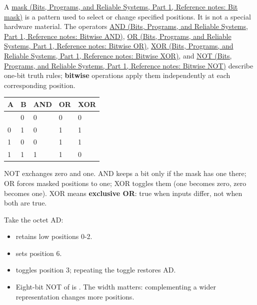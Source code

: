 \hypertarget{05-engine-i-ch001-a-mask-selects-positions}{}

A \href{../01-Bits-Programs-and-Reliable-Systems-P01/main.pdf\#appendix-dbe5905163c2}{mask (Bits, Programs, and Reliable Systems, Part 1, Reference notes: Bit mask)} is a pattern used to select or change specified positions. It is not a special hardware material. The operators \href{../01-Bits-Programs-and-Reliable-Systems-P01/main.pdf\#appendix-68b52453737c}{AND (Bits, Programs, and Reliable Systems, Part 1, Reference notes: Bitwise AND)}, \href{../01-Bits-Programs-and-Reliable-Systems-P01/main.pdf\#appendix-a427ce8ce8a6}{OR (Bits, Programs, and Reliable Systems, Part 1, Reference notes: Bitwise OR)}, \href{../01-Bits-Programs-and-Reliable-Systems-P01/main.pdf\#appendix-d49161831368}{XOR (Bits, Programs, and Reliable Systems, Part 1, Reference notes: Bitwise XOR)}, and \href{../01-Bits-Programs-and-Reliable-Systems-P01/main.pdf\#appendix-8f38927cfc54}{NOT (Bits, Programs, and Reliable Systems, Part 1, Reference notes: Bitwise NOT)} describe one-bit truth rules; \textbf{bitwise} operations apply them independently at each corresponding position.

{\def\LTcaptype{none} %
\begin{longtable}[]{@{}lllll@{}}
\toprule\noalign{}
A & B & AND & OR & XOR \\
\midrule\noalign{}
\endhead
\bottomrule\noalign{}
\endlastfoot
0 & 0 & 0 & 0 & 0 \\
0 & 1 & 0 & 1 & 1 \\
1 & 0 & 0 & 1 & 1 \\
1 & 1 & 1 & 1 & 0 \\
\end{longtable}
}

NOT exchanges zero and one. AND keeps a bit only if the mask has one there; OR forces masked positions to one; XOR toggles them (one becomes zero, zero becomes one). XOR means \textbf{exclusive OR}: true when inputs differ, not when both are true.

Take the octet AD:

\begin{itemize}
\tightlist
\item
   retains low positions 0-2.
\item
   sets position 6.
\item
   toggles position 3; repeating the toggle restores AD.
\item
  Eight-bit NOT of  is . The width matters: complementing a wider representation changes more positions.
\end{itemize}

